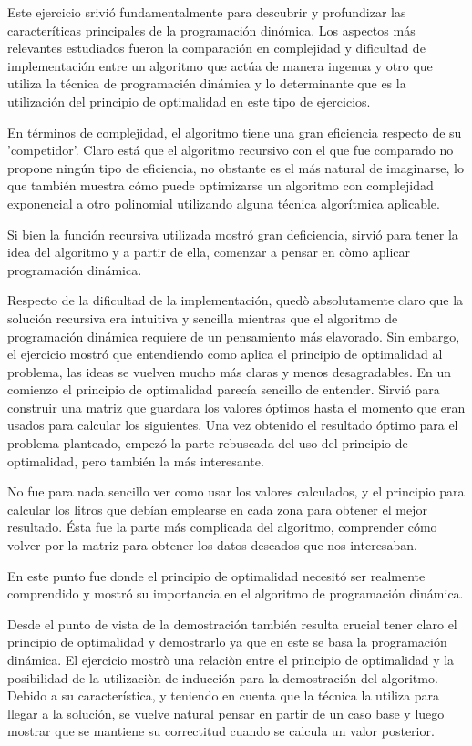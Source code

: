 \documentclass[a4paper,11pt] {article}
\begin{document}
Este ejercicio srivió fundamentalmente para descubrir y profundizar las caracteríticas principales de la programación dinómica.
Los aspectos más relevantes estudiados fueron la comparación en complejidad y dificultad de implementación entre un algoritmo que actúa de manera ingenua y otro que utiliza la técnica de programacién dinámica y lo determinante que es la utilización del principio de optimalidad en este tipo de ejercicios.

En términos de complejidad, el algoritmo tiene una gran eficiencia respecto de su 'competidor'. Claro está que el algoritmo recursivo con el que fue comparado no propone ningún tipo de eficiencia, no obstante es el más natural de imaginarse, lo que también muestra cómo puede optimizarse un algoritmo con complejidad exponencial a otro polinomial utilizando alguna técnica algorítmica aplicable.

Si bien la función recursiva utilizada mostró gran deficiencia, sirvió para tener la idea del algoritmo y a partir de ella, comenzar a pensar en còmo aplicar programación dinámica.

Respecto de la dificultad de la implementación, quedò absolutamente claro que la solución recursiva era intuitiva y sencilla mientras que el algoritmo de programación dinámica requiere de un pensamiento más elavorado. Sin embargo, el ejercicio mostró que entendiendo como aplica el principio de optimalidad al problema, las ideas se vuelven mucho más claras y menos desagradables.
En un comienzo el principio de optimalidad parecía sencillo de entender. Sirvió para construir una matriz que guardara los valores óptimos hasta el momento que eran usados para calcular los siguientes. Una vez obtenido el resultado óptimo para el problema planteado, empezó la parte rebuscada del uso del principio de optimalidad, pero también la más interesante.

No fue para nada sencillo ver como usar los valores calculados, y el principio para calcular los litros que debían emplearse en cada zona para obtener el mejor resultado. Ésta fue la parte más complicada del algoritmo, comprender cómo volver por la matriz para obtener los datos deseados que nos interesaban.

En este punto fue donde el principio de optimalidad necesitó ser realmente comprendido y mostró su importancia en el algoritmo de programación dinámica.

Desde el punto de vista de la demostración también resulta crucial tener claro el principio de optimalidad y demostrarlo ya que en este se basa la programación dinámica. El ejercicio mostrò una relaciòn entre el principio de optimalidad y la posibilidad de la utilizaciòn de inducción para la demostración del algoritmo. Debido a su característica, y teniendo en cuenta que la técnica la utiliza para llegar a la solución, se vuelve natural pensar en partir de un caso base y luego mostrar que se mantiene su correctitud cuando se calcula un valor posterior.
\end{document}
